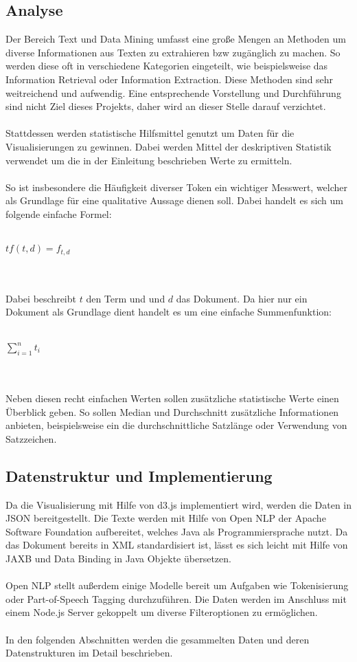 \subsection{Analyse}
Der Bereich Text und Data Mining umfasst eine große Mengen an Methoden um diverse Informationen aus Texten zu extrahieren bzw zugänglich zu machen. So werden diese oft in verschiedene Kategorien eingeteilt, wie beispielsweise das Information Retrieval oder Information Extraction. Diese Methoden sind sehr weitreichend und aufwendig. Eine entsprechende Vorstellung und Durchführung sind nicht Ziel dieses Projekts, daher wird an dieser Stelle darauf verzichtet.\\
\\
Stattdessen werden statistische Hilfsmittel genutzt um Daten für die Visualisierungen zu gewinnen. Dabei werden Mittel der deskriptiven Statistik verwendet um die in der Einleitung beschrieben Werte zu ermitteln.\\
\\
So ist insbesondere die Häufigkeit diverser Token ein wichtiger Messwert, welcher als Grundlage für eine qualitative Aussage dienen soll. Dabei handelt es sich um folgende einfache Formel:\\
\\
\centerline{$ tf(t,d) = f_{t,d} $}\\
\\
Dabei beschreibt $t$ den Term und und $d$ das Dokument. Da hier nur ein Dokument als Grundlage dient handelt es um eine einfache Summenfunktion:\\
\\
\centerline{$\sum_{i=1}^{n} t_i$}\\
\\
Neben diesen recht einfachen Werten sollen zusätzliche statistische Werte einen Überblick geben. So sollen Median und Durchschnitt zusätzliche Informationen anbieten, beispielsweise ein die durchschnittliche Satzlänge oder Verwendung von Satzzeichen.

\subsection{Datenstruktur und Implementierung}
Da die Visualisierung mit Hilfe von d3.js implementiert wird, werden die Daten in JSON bereitgestellt. Die Texte werden mit Hilfe von Open NLP der Apache Software Foundation aufbereitet, welches Java als Programmiersprache nutzt. Da das Dokument bereits in XML standardisiert ist, lässt es sich leicht mit Hilfe von JAXB und Data Binding in Java Objekte übersetzen. \\
\\
Open NLP stellt außerdem einige Modelle bereit um Aufgaben wie Tokenisierung oder Part-of-Speech Tagging durchzuführen. Die Daten werden im Anschluss mit einem Node.js Server gekoppelt um diverse Filteroptionen zu ermöglichen.\\
\\
In den folgenden Abschnitten werden die gesammelten Daten und deren Datenstrukturen im Detail beschrieben.
\newpage
